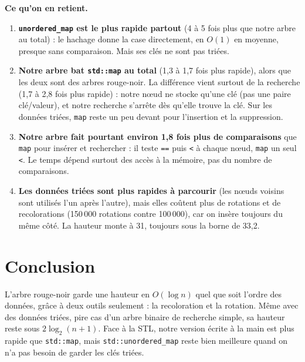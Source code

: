 \documentclass[11pt,a4paper]{article}
\begin{document}
\textbf{Ce qu'on en retient.}
\begin{enumerate}
  \item \textbf{\texttt{unordered\_map} est le plus rapide partout} (4 à 5 fois plus que notre
        arbre au total) : le hachage donne la case directement, en $O(1)$ en moyenne, presque
        sans comparaison. Mais ses clés ne sont pas triées.
  \item \textbf{Notre arbre bat \texttt{std::map} au total} (1,3 à 1,7 fois plus rapide),
        alors que les deux sont des arbres rouge-noir. La différence vient surtout de la
        recherche (1,7 à 2,8 fois plus rapide) : notre nœud ne stocke qu'une clé (pas une paire
        clé/valeur), et notre recherche s'arrête dès qu'elle trouve la clé. Sur les données
        triées, \texttt{map} reste un peu devant pour l'insertion et la suppression.
  \item \textbf{Notre arbre fait pourtant environ 1,8 fois plus de comparaisons} que
        \texttt{map} pour insérer et rechercher : il teste \texttt{==} puis \texttt{<} à
        chaque nœud, \texttt{map} un seul \texttt{<}. Le temps dépend surtout des accès à la
        mémoire, pas du nombre de comparaisons.
  \item \textbf{Les données triées sont plus rapides à parcourir} (les nœuds voisins sont
        utilisés l'un après l'autre), mais elles coûtent plus de rotations et de
        recolorations (150\,000 rotations contre 100\,000), car on insère toujours du même
        côté. La hauteur monte à 31, toujours sous la borne de 33,2.
\end{enumerate}

\section{Conclusion}

L'arbre rouge-noir garde une hauteur en $O(\log n)$ quel que soit l'ordre des données,
grâce à deux outils seulement : la recoloration et la rotation. Même avec des données
triées, pire cas d'un arbre binaire de recherche simple, sa hauteur reste sous
$2\log_2(n+1)$. Face à la STL, notre version écrite à la main est plus rapide que
\texttt{std::map}, mais \texttt{std::unordered\_map} reste bien meilleure quand on n'a pas
besoin de garder les clés triées.
\end{document}

